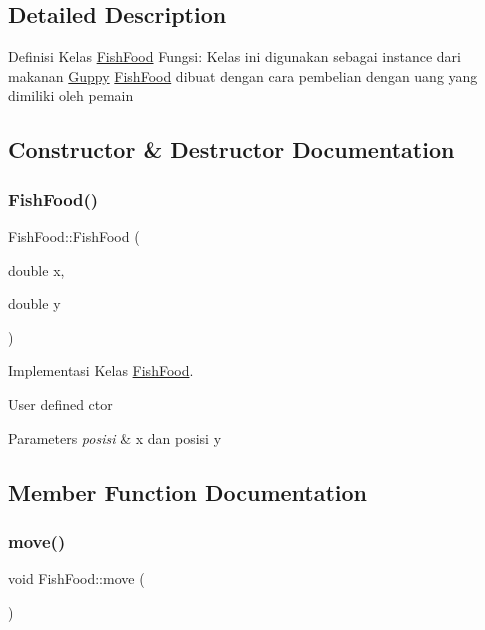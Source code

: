 \subsection{Detailed Description}
Definisi Kelas \mbox{\hyperlink{class_fish_food}{Fish\+Food}} Fungsi\+: Kelas ini digunakan sebagai instance dari makanan \mbox{\hyperlink{class_guppy}{Guppy}} \mbox{\hyperlink{class_fish_food}{Fish\+Food}} dibuat dengan cara pembelian dengan uang yang dimiliki oleh pemain 

\subsection{Constructor \& Destructor Documentation}
\mbox{\label{class_fish_food_a3e2ae5b4b6c889595605f66bb9974b98}} 
\subsubsection{\texorpdfstring{Fish\+Food()}{FishFood()}}
{\footnotesize\ttfamily Fish\+Food\+::\+Fish\+Food (\begin{DoxyParamCaption}\item[{double}]{x,  }\item[{double}]{y }\end{DoxyParamCaption})}



Implementasi Kelas \mbox{\hyperlink{class_fish_food}{Fish\+Food}}. 

User defined ctor 
\begin{DoxyParams}{Parameters}
{\em posisi} & x dan posisi y \\
\hline
\end{DoxyParams}


\subsection{Member Function Documentation}
\mbox{\label{class_fish_food_a411070d0e4f5c964ff34ca17fca0ec05}} 
\subsubsection{\texorpdfstring{move()}{move()}}
{\footnotesize\ttfamily void Fish\+Food\+::move (\begin{DoxyParamCaption}{ }\end{DoxyParamCaption})\hspace{0.3cm}{\ttfamily [virtual]}}

